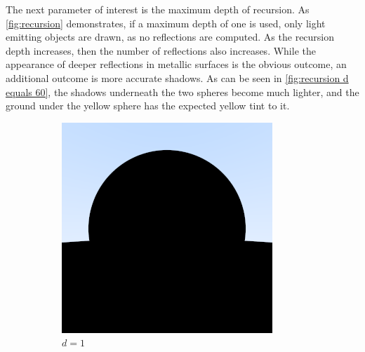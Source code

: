 \documentclass[10pt]{IEEEtran}
\begin{document}
The next parameter of interest is the maximum depth of recursion. As \cref{fig:recursion}
demonstrates, if a maximum depth of one is used, only light emitting objects are drawn, as no
reflections are computed. As the recursion depth increases, then the number of reflections also
increases. While the appearance of deeper reflections in metallic surfaces is the obvious outcome,
an additional outcome is more accurate shadows. As can be seen in \cref{fig:recursion d equals 60},
the shadows underneath the  two spheres become much lighter, and the ground under the yellow sphere
has the expected yellow tint to it.

\begin{figure}
    \caption{ The effect of recursion depth on image quality. This is an image of two metallic
        spheres, immediately in front and behind the camera, rendered with $d$ max recursion depth.
        Note that, because the camera has no ray collision logic, it remains invisible.}
    \label{fig:recursion}
    \centering
    \begin{subfigure}[b]{0.2\textwidth}
        \centering
        \includegraphics[width=\textwidth]{images/recursiveDepth/1.png}
        \caption{$d=1$}
        \label{fig:recursion d equals 1}
    \end{subfigure}
    \begin{subfigure}[b]{0.2\textwidth}

\end{subfigure}
\end{figure}
\end{document}

